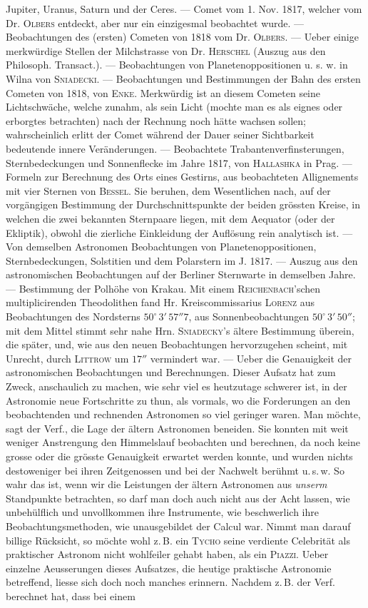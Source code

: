 Jupiter, Uranus, Saturn und der Ceres. --- Comet vom 1. Nov. 1817, welcher vom Dr. \textsc{Olbers} entdeckt, aber nur ein einzigesmal beobachtet wurde. --- Beobachtungen des (ersten) Cometen von 1818 vom Dr. \textsc{Olbers}. --- Ueber einige merkwürdige Stellen der Milchstrasse von Dr. \textsc{Herschel} (Auszug aus den Philosoph. Transact.). --- Beobachtungen von Planetenoppositionen u. s. w. in Wilna von \textsc{Sniadecki}. --- Beobachtungen und Bestimmungen der Bahn des ersten Cometen von 1818, von \textsc{Enke}. Merkwürdig ist an diesem Cometen seine Lichtschwäche, welche zunahm, als sein Licht (mochte man es als eignes oder erborgtes betrachten) nach der Rechnung noch hätte wachsen sollen; wahrscheinlich erlitt der Comet während der Dauer seiner Sichtbarkeit bedeutende innere Veränderungen. --- Beobachtete Trabantenverfinsterungen, Sternbedeckungen und Sonnenflecke im Jahre 1817, von \textsc{Hallashka} in Prag. --- Formeln zur Berechnung des Orts eines Gestirns, aus beobachteten Allignements mit vier Sternen von \textsc{Bessel}. Sie beruhen, dem Wesentlichen nach, auf der vorgängigen Bestimmung der Durchschnittspunkte der beiden grössten Kreise, in welchen die zwei bekannten Sternpaare liegen, mit dem Aequator (oder der Ekliptik), obwohl die zierliche Einkleidung der Auflösung rein analytisch ist. --- Von demselben Astronomen Beobachtungen von Planetenoppositionen, Sternbedeckungen, Solstitien und dem Polarstern im J. 1817. --- Auszug aus den astronomischen Beobachtungen auf der Berliner Sternwarte in demselben Jahre. --- Bestimmung der Polhöhe von Krakau. Mit einem \textsc{Reichenbach}'schen multiplicirenden Theodolithen fand Hr. Kreiscommissarius \textsc{Lorenz} aus Beobachtungen des Nordsterns $50^\circ\,3'\,57''7$, aus Sonnenbeobachtungen $50^\circ\,3'\,50''$; mit dem Mittel stimmt sehr nahe Hrn. \textsc{Sniadecky}'s ältere Bestimmung überein, die später, und, wie aus den neuen Beobachtungen hervorzugehen scheint, mit Unrecht, durch \textsc{Littrow} um $17''$ vermindert war. --- Ueber die Genauigkeit der astronomischen Beobachtungen und Berechnungen. Dieser Aufsatz hat zum Zweck, anschaulich zu machen, wie sehr viel es heutzutage schwerer ist, in der Astronomie neue Fortschritte zu thun, als vormals, wo die Forderungen an den beobachtenden und rechnenden Astronomen so viel geringer waren. Man möchte, sagt der Verf., die Lage der ältern Astronomen beneiden. Sie konnten mit weit weniger Anstrengung den Himmelslauf beobachten und berechnen, da noch keine grosse oder die grösste Genauigkeit erwartet werden konnte, und wurden nichts destoweniger bei ihren Zeitgenossen und bei der Nachwelt berühmt u.\,s.\,w. So wahr das ist, wenn wir die Leistungen der ältern Astronomen aus \emph{unserm} Standpunkte betrachten, so darf man doch auch nicht aus der Acht lassen, wie unbehülflich und unvollkommen ihre Instrumente, wie beschwerlich ihre Beobachtungsmethoden, wie unausgebildet der Calcul war. Nimmt man darauf billige Rücksicht, so möchte wohl z.\,B. ein \textsc{Tycho} seine verdiente Celebrität als praktischer Astronom nicht wohlfeiler gehabt haben, als ein \textsc{Piazzi}. Ueber einzelne Aeusserungen dieses Aufsatzes, die heutige praktische Astronomie betreffend, liesse sich doch noch manches erinnern. Nachdem z.\,B. der Verf. berechnet hat, dass bei einem 